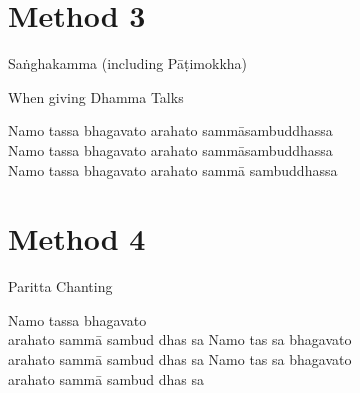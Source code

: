 \section*{Method 3}

\vspace*{-5pt}

\begin{packeditemize}
\item Saṅghakamma (including Pāṭimokkha)
\item When giving Dhamma Talks
\end{packeditemize}

\bigskip

{\smaller
Namo tassa bhagavato arahato sammāsambuddhassa\\
Namo tassa \textbar\textbar{} bhagavato arahato sammāsambuddhassa \textbar\textbar{}\\
Namo tassa bhagavato \textbar\textbar{} arahato sammā \textbar\textbar{} sambuddhassa
}

\section*{Method 4}

\vspace*{-5pt}

\begin{packeditemize}
\item Paritta Chanting
\end{packeditemize}

\bigskip

\parbox{1.05\linewidth}{%
{\smaller
Namo tassa bhagavato \textbar\textbar{}\\
arahato \textbar{} sammā \textbar{} sambud \textbar{} dhas \textbar\textbar{} sa Namo tas \textbar\textbar{} sa bhagavato \textbar{}\\
arahato \textbar{} sammā \textbar{} sambud \textbar{} dhas \textbar\textbar{} sa Namo tas \textbar\textbar{} sa bhagavato \textbar{}\\
arahato \textbar{} sammā \textbar{} sambud \textbar{} dhas \textbar\textbar{} sa
}}
